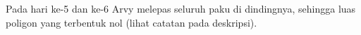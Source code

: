 \documentclass{article}
\begin{document}
\begin{center}
\end{center}
Pada hari ke-5 dan ke-6 Arvy melepas seluruh paku di dindingnya, sehingga luas poligon yang terbentuk nol (lihat catatan pada deskripsi).
\end{document}
